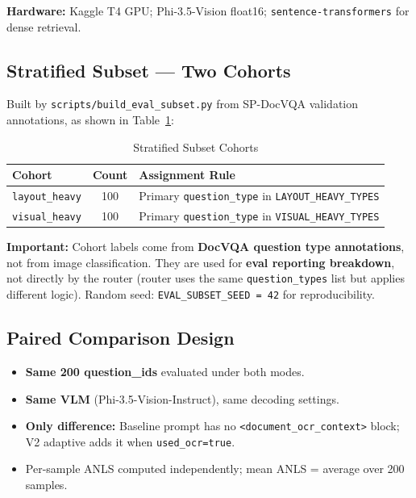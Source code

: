 \documentclass[11pt,a4paper]{article}
\begin{document}
\noindent\textbf{Hardware:} Kaggle T4 GPU; Phi-3.5-Vision float16; \texttt{sentence-transformers} for dense retrieval.

\subsection{Stratified Subset --- Two Cohorts}
Built by \texttt{scripts/build\_eval\_subset.py} from SP-DocVQA validation annotations, as shown in Table~\ref{tab:stratified_cohorts}:

\begin{table}[H]
\centering
\caption{Stratified Subset Cohorts}
\label{tab:stratified_cohorts}
\begin{tabular}{|l|c|p{8cm}|}
\hline
\textbf{Cohort} & \textbf{Count} & \textbf{Assignment Rule} \\ \hline
\texttt{layout\_heavy} & 100 & Primary \texttt{question\_type} in \texttt{LAYOUT\_HEAVY\_TYPES} \\ \hline
\texttt{visual\_heavy} & 100 & Primary \texttt{question\_type} in \texttt{VISUAL\_HEAVY\_TYPES} \\ \hline
\end{tabular}
\end{table}

\textbf{Important:} Cohort labels come from \textbf{DocVQA question type annotations}, not from image classification. They are used for \textbf{eval reporting breakdown}, not directly by the router (router uses the same \texttt{question\_types} list but applies different logic). Random seed: \texttt{EVAL\_SUBSET\_SEED = 42} for reproducibility.

\subsection{Paired Comparison Design}
\begin{itemize}
    \item \textbf{Same 200 question\_ids} evaluated under both modes.
    \item \textbf{Same VLM} (Phi-3.5-Vision-Instruct), same decoding settings.
    \item \textbf{Only difference:} Baseline prompt has no \texttt{<document\_ocr\_context>} block; V2 adaptive adds it when \texttt{used\_ocr=true}.
    \item Per-sample ANLS computed independently; mean ANLS = average over 200 samples.
\end{itemize}
\end{document}
